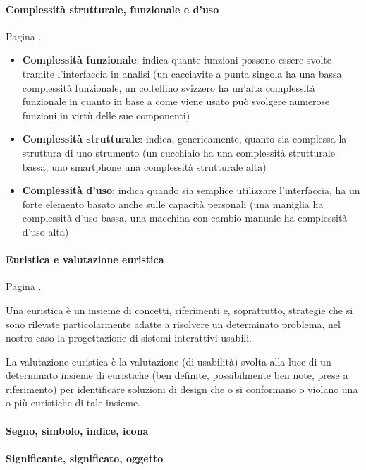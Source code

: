 \documentclass[11pt,a4paper]{book}
\begin{document}
\paragraph{Complessità strutturale, funzionale e d'uso}
Pagina \pageref{par: complessità}.

\begin{itemize}
	\item \textbf{Complessità funzionale}: indica quante funzioni possono essere svolte tramite l'interfaccia in analisi (un cacciavite a punta singola ha una bassa complessità funzionale, un coltellino svizzero ha un'alta complessità funzionale in quanto in base a come viene usato può svolgere numerose funzioni in virtù delle sue componenti)
	\item \textbf{Complessità strutturale}: indica, genericamente, quanto sia complessa la struttura di uno strumento (un cucchiaio ha una complessità strutturale bassa, uno smartphone una complessità strutturale alta)
	\item \textbf{Complessità d'uso}: indica quando sia semplice utilizzare l'interfaccia, ha un forte elemento basato anche sulle capacità personali (una maniglia ha complessità d'uso bassa, una macchina con cambio manuale ha complessità d'uso alta)
\end{itemize}

\paragraph{Euristica e valutazione euristica}
Pagina \pageref{par: euristica}.

Una euristica è un insieme di concetti, riferimenti e, soprattutto, strategie che si sono rilevate particolarmente adatte a risolvere un determinato problema, nel nostro caso la progettazione di sistemi interattivi usabili.

La valutazione euristica è la valutazione (di usabilità) svolta alla luce di un determinato insieme di euristiche (ben definite, possibilmente ben note, prese a riferimento) per identificare soluzioni di design che o si conformano o violano una o più euristiche di tale insieme.

\paragraph{Segno, simbolo, indice, icona}


\paragraph{Significante, significato, oggetto}
\end{document}
